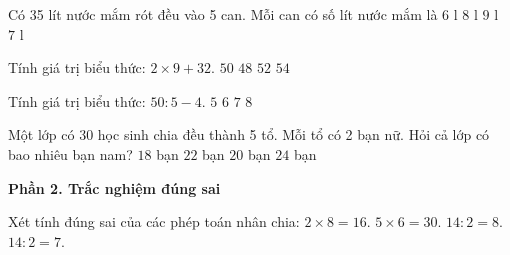 \begin{ex} %
Có 35 lít nước mắm rót đều vào 5 can. Mỗi can có số lít nước mắm là
\choice
{$6\text{ l}$}
{$8\text{ l}$}
{$9\text{ l}$}
{\True $7\text{ l}$}
\end{ex}

\begin{ex} %
Tính giá trị biểu thức: $2 \times 9 + 32$.
\choice
{\True $50$}
{$48$}
{$52$}
{$54$}
\end{ex}

\begin{ex} %
Tính giá trị biểu thức: $50 : 5 - 4$.
\choice
{$5$}
{\True $6$}
{$7$}
{$8$}
\end{ex}

\begin{ex} %
Một lớp có 30 học sinh chia đều thành 5 tổ. Mỗi tổ có 2 bạn nữ. Hỏi cả lớp có bao nhiêu bạn nam?
\choice
{$18$ bạn}
{$22$ bạn}
{\True $20$ bạn}
{$24$ bạn}
\end{ex}

\textbf{Phần 2. Trắc nghiệm đúng sai}

\begin{ex} %
Xét tính đúng sai của các phép toán nhân chia:
\choiceTF
{\True $2 \times 8 = 16$.}
{\True $5 \times 6 = 30$.}
{$14 : 2 = 8$.}
{\True $14 : 2 = 7$.}
\end{ex}

